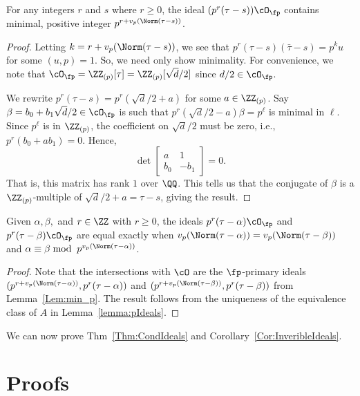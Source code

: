 \documentclass[11pt, proquest]{uwthesis}
\begin{document}
\begin{lemma}\label{Lem:min_p}
For any integers $r$ and $s$ where $r\geq 0$, the ideal $(p^r(\tau-s))\cO_\fp$ contains minimal, positive integer $p^{r+v_p(\Norm(\tau-s))}$.
\end{lemma}
\begin{proof}
Letting $k=r+v_p(\Norm(\tau-s))$, we see that $p^r(\tau-s)(\bar{\tau}-s) = p^k u$ for some $(u,p)=1$.
So, we need only show minimality.
For convenience, we note that $\cO_\fp = \ZZ_{(p)}[\tau] = \ZZ_{(p)}[\sqrt{d}/2]$ since $d/2\in\cO_\fp$.

We rewrite $p^r(\tau-s) = p^r(\sqrt{d}/2+a)$ for some $a\in\ZZ_{(p)}$.
Say $\beta=b_0+b_1\sqrt{d}/2\in\cO_\fp$ is such that $p^r(\sqrt{d}/2-a)\beta = p^\ell$ is minimal in $\ell$.
Since $p^\ell$ is in $\ZZ_{(p)}$, the coefficient on $\sqrt{d}/2$ must be zero, i.e., $p^r(b_0+ab_1)=0$. Hence,
\[
\det\begin{bmatrix}
a & 1\\
b_0 & -b_1
\end{bmatrix} = 0.
\]
That is, this matrix has rank $1$ over $\QQ$.
This tells us that the conjugate of $\beta$ is a $\ZZ_{(p)}$-multiple of $\sqrt{d}/2 +a=\tau-s$, giving the result.
\end{proof}


\begin{lemma}\label{Lem:principal_gen}Given $\alpha,\beta,$ and $r\in\ZZ$ with $r\geq0$, the ideals $p^r(\tau-\alpha)\cO_\fp$ and $p^r(\tau-\beta)\cO_\fp$ are equal exactly when $v_p(\Norm(\tau-\alpha)) = v_p(\Norm(\tau-\beta))$ and $\alpha\equiv \beta\bmod\; p^{v_p(\Norm(\tau-\alpha))}$.
\end{lemma}
\begin{proof}
Note that the intersections with $\cO$ are the $\fp$-primary ideals $(p^{r+v_p(\Norm(\tau-\alpha))},p^r(\tau-\alpha))$ and $(p^{r+v_p(\Norm(\tau-\beta))},p^r(\tau-\beta))$ from Lemma~\ref{Lem:min_p}.
The result follows from the uniqueness of the equivalence class of $A$ in Lemma~\ref{lemma:pIdeals}.
\end{proof}

We can now prove Thm~\ref{Thm:CondIdeals} and Corollary~\ref{Cor:InveribleIdeals}.

\section{Proofs}\label{Proofs:Sec}
\end{document}
